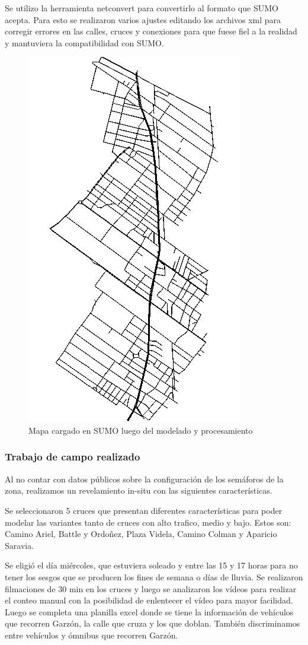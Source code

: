 Se utilizo la herramienta netconvert para convertirlo al formato que SUMO acepta. 
Para esto se realizaron varios ajustes editando los archivos xml para corregir errores en las calles, cruces y conexiones para que fuese fiel a la realidad y mantuviera la compatibilidad con SUMO.


\begin{figure}[h]
\centering
\includegraphics[width=0.5\linewidth]{Figures/mapa_sumo}
\caption{Mapa cargado en SUMO luego del modelado y procesamiento}
\label{fig:mapa_sumo}
\end{figure}



\subsubsection{Trabajo de campo realizado}
Al no contar con datos públicos sobre la configuración de los semáforos de la zona, realizamos un revelamiento in-situ con las siguientes características.

Se seleccionaron 5 cruces que presentan diferentes características para poder modelar las variantes tanto de cruces con alto trafico, medio y bajo. 
Estos son: Camino Ariel, Battle y Ordoñez, Plaza Videla, Camino Colman y Aparicio Saravia.

Se eligió el día miércoles, que estuviera soleado y entre las 15 y 17 horas para no tener los sesgos que se producen los fines de semana o días de lluvia.
Se realizaron filmaciones de 30 min en los cruces y luego se analizaron los vídeos para realizar el conteo manual con la posibilidad de enlentecer el vídeo para mayor facilidad. Luego se completa una planilla excel donde se tiene la información de vehículos que recorren Garzón, la calle que cruza y los que doblan. También discriminamos entre vehículos y ómnibus que recorren Garzón.

